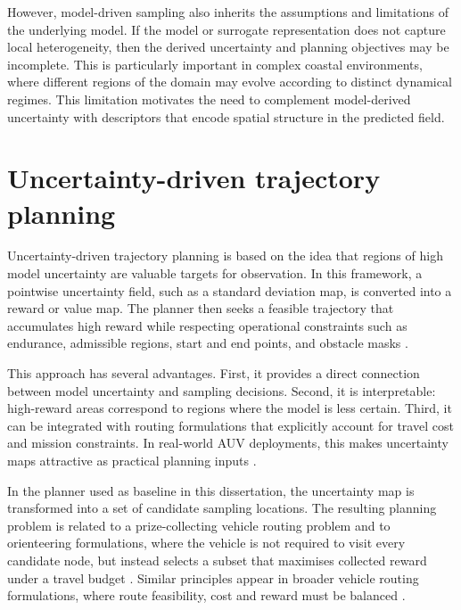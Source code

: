 However, model-driven sampling also inherits the assumptions and limitations of the underlying model. If the model or surrogate representation does not capture local heterogeneity, then the derived uncertainty and planning objectives may be incomplete. This is particularly important in complex coastal environments, where different regions of the domain may evolve according to distinct dynamical regimes. This limitation motivates the need to complement model-derived uncertainty with descriptors that encode spatial structure in the predicted field.

\section{Uncertainty-driven trajectory planning} \label{sec:rw_uncertainty_planning}

Uncertainty-driven trajectory planning is based on the idea that regions of high model uncertainty are valuable targets for observation. In this framework, a pointwise uncertainty field, such as a standard deviation map, is converted into a reward or value map. The planner then seeks a feasible trajectory that accumulates high reward while respecting operational constraints such as endurance, admissible regions, start and end points, and obstacle masks \parencite{bernacchi2025closingloop,duarte2025geostatistical}.

This approach has several advantages. First, it provides a direct connection between model uncertainty and sampling decisions. Second, it is interpretable: high-reward areas correspond to regions where the model is less certain. Third, it can be integrated with routing formulations that explicitly account for travel cost and mission constraints. In real-world AUV deployments, this makes uncertainty maps attractive as practical planning inputs \parencite{bernacchi2025closingloop}.

In the planner used as baseline in this dissertation, the uncertainty map is transformed into a set of candidate sampling locations. The resulting planning problem is related to a prize-collecting vehicle routing problem and to orienteering formulations, where the vehicle is not required to visit every candidate node, but instead selects a subset that maximises collected reward under a travel budget \parencite{bernacchi2025closingloop,vansteenwegen2011orienteering,gunawan2016orienteering}. Similar principles appear in broader vehicle routing formulations, where route feasibility, cost and reward must be balanced \parencite{toth2014vehicle,vidal2013hybrid}.

